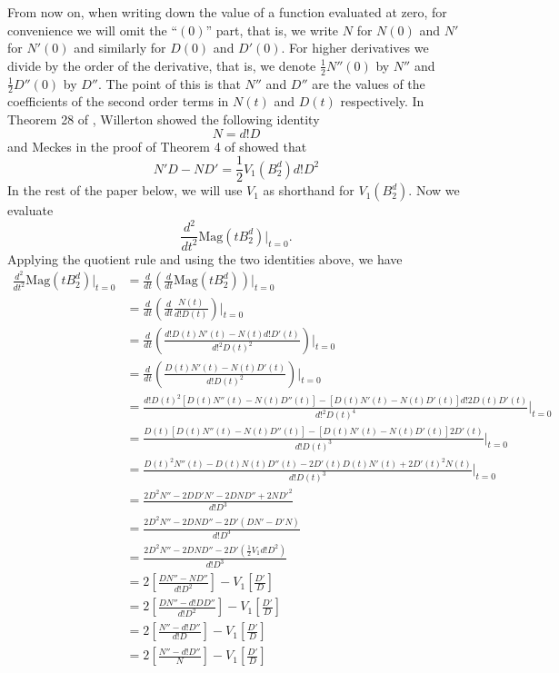 \documentclass[11pt]{article}
\theoremstyle{mythm}
\begin{document}
From now on, when writing down the value of a function evaluated at zero, for convenience we will omit the ``$(0)$'' part, that is, we write $N$ for $N(0)$ and $N'$ for $N'(0)$ and similarly for $D(0)$ and $D'(0)$. For higher derivatives we divide by the order of the derivative, that is, we denote $\frac{1}{2}N''(0)$ by $N''$ and $\frac{1}{2}D''(0)$ by $D''$. The point of this is that $N''$ and $D''$ are the values of the coefficients of the second order terms in $N(t)$ and $D(t)$ respectively. In Theorem 28 of \cite{willerton_magnitude_2017}, Willerton showed the following identity
\begin{equation*}
N = d!D
\end{equation*}
and Meckes in the proof of Theorem 4 of \cite{meckes_magnitude_2019} showed that
\begin{equation*}
N'D - ND' = \frac{1}{2}V_1\left(B_2^d\right)d!D^2
\end{equation*}
In the rest of the paper below, we will use $V_1$ as shorthand for $V_1\left(B_2^d\right)$.
Now we evaluate
\begin{equation*}
\frac{d^2}{dt^2}\text{Mag}(tB_2^d)\big\vert_{t=0}.
\end{equation*}
Applying the quotient rule and using the two identities above, we have
\begin{align*}
\frac{d^2}{dt^2}\text{Mag}(tB_2^d)\big\vert_{t=0} &= \frac{d}{dt}\left(\frac{d}{dt}\text{Mag}(tB_2^d)\right)\big\vert_{t=0} \\
&= \frac{d}{dt}\left(\frac{d}{dt}\frac{N(t)}{d!D(t)}\right)\big\vert_{t=0} \\
&= \frac{d}{dt}\left(\frac{d!D(t)N'(t)-N(t)d!D'(t)}{d!^2D(t)^2}\right)\big\vert_{t=0} \\
&= \frac{d}{dt}\left(\frac{D(t)N'(t)-N(t)D'(t)}{d!D(t)^2}\right)\big\vert_{t=0} \\
&= \frac{d!D(t)^2[D(t)N''(t)-N(t)D''(t)]-[D(t)N'(t)-N(t)D'(t)]d!2D(t)D'(t)}{d!^2D(t)^4}\big\vert_{t=0} \\
&= \frac{D(t)[D(t)N''(t)-N(t)D''(t)]-[D(t)N'(t)-N(t)D'(t)]2D'(t)}{d!D(t)^3}\big\vert_{t=0} \\
&= \frac{D(t)^2N''(t)-D(t)N(t)D''(t)-2D'(t)D(t)N'(t)+2D'(t)^2N(t)}{d!D(t)^3}\big\vert_{t=0} \\
&= \frac{2D^2N''-2DD'N'-2DND''+2ND'^2}{d!D^3} \\
&= \frac{2D^2N''-2DND''-2D'(DN'-D'N)}{d!D^3} \\
&= \frac{2D^2N''-2DND''-2D'(\frac{1}{2}V_1d!D^2)}{d!D^3} \\
&= 2\left[\frac{DN''-ND''}{d!D^2}\right]-V_1\left[\frac{D'}{D}\right] \\
&= 2\left[\frac{DN''-d!DD''}{d!D^2}\right] - V_1\left[\frac{D'}{D}\right] \\
&= 2\left[\frac{N''-d!D''}{d!D}\right] - V_1\left[\frac{D'}{D}\right] \\
&= 2\left[\frac{N''-d!D''}{N}\right] - V_1\left[\frac{D'}{D}\right]
\end{align*}
\end{document}
